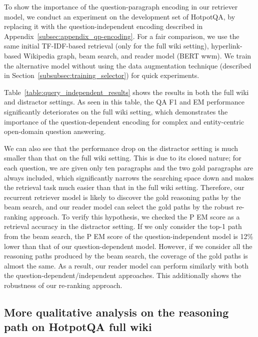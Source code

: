 \documentclass{article} \usepackage{iclr2020_conference,times}
\begin{document}
To show the importance of the question-paragraph encoding in our retriever model, we conduct an experiment on the development set of HotpotQA, by replacing it with the question-independent encoding described in Appendix~\ref{subsec:appendix_qp-encoding}.
For a fair comparison, we use the same initial TF-IDF-based retrieval (only for the full wiki setting), hyperlink-based Wikipedia graph, beam search, and reader model (BERT wwm).
We train the alternative model without using the data augmentation technique (described in Section~\ref{subsubsec:training_selector}) for quick experiments.



Table~\ref{table:query_independent_results} shows the results in both the full wiki and distractor settings.
As seen in this table, the QA F1 and EM performance significantly deteriorates on the full wiki setting, which demonstrates the importance of the question-dependent encoding for complex and entity-centric open-domain question answering.


We can also see that the performance drop on the distractor setting is much smaller than that on the full wiki setting.
This is due to its closed nature; for each question, we are given only ten paragraphs and the two gold paragraphs are always included, which significantly narrows the searching space down and makes the retrieval task much easier than that in the full wiki setting.
Therefore, our recurrent retriever model is likely to discover the gold reasoning paths by the beam search, and our reader model can select the gold paths by the robust re-ranking approach.
To verify this hypothesis, we checked the P EM score as a retrieval accuracy in the distractor setting.
If we only consider the top-1 path from the beam search, the P EM score of the question-independent model is 12\% lower than that of our question-dependent model.
However, if we consider all the reasoning paths produced by the beam search, the coverage of the gold paths is almost the same.
As a result, our reader model can perform similarly with both the question-dependent/independent approaches.
This additionally shows the robustness of our re-ranking approach.



\subsection{More qualitative analysis on the reasoning path on HotpotQA full wiki}
\label{subsec:appendix_qualitative_examples}
\end{document}
